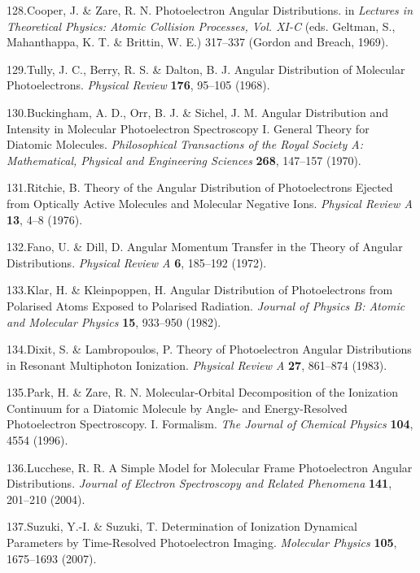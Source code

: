 \documentclass[10pt]{article}
\begin{document}
\label{csl:128}128.Cooper, J. \& Zare, R. N. {Photoelectron {{Angular Distributions}}}. in \textit{Lectures in {{Theoretical Physics}}: {{Atomic Collision Processes}}, {{Vol}}. {{XI}}-{{C}}} (eds. Geltman, S., Mahanthappa, K. T. \& Brittin, W. E.) 317–337 ({Gordon and Breach}, 1969).

\label{csl:129}129.Tully, J. C., Berry, R. S. \& Dalton, B. J. {Angular {{Distribution}} of {{Molecular Photoelectrons}}}. \textit{Physical Review} \textbf{176}, 95–105 (1968).

\label{csl:130}130.Buckingham, A. D., Orr, B. J. \& Sichel, J. M. {Angular {{Distribution}} and {{Intensity}} in {{Molecular Photoelectron Spectroscopy I}}. {{General Theory}} for {{Diatomic Molecules}}}. \textit{Philosophical Transactions of the Royal Society A: Mathematical, Physical and Engineering Sciences} \textbf{268}, 147–157 (1970).

\label{csl:131}131.Ritchie, B. {Theory of the Angular Distribution of Photoelectrons Ejected from Optically Active Molecules and Molecular Negative Ions}. \textit{Physical Review A} \textbf{13}, 4–8 (1976).

\label{csl:132}132.Fano, U. \& Dill, D. {Angular {{Momentum Transfer}} in the {{Theory}} of {{Angular Distributions}}}. \textit{Physical Review A} \textbf{6}, 185–192 (1972).

\label{csl:133}133.Klar, H. \& Kleinpoppen, H. {Angular Distribution of Photoelectrons from Polarised Atoms Exposed to Polarised Radiation}. \textit{Journal of Physics B: Atomic and Molecular Physics} \textbf{15}, 933–950 (1982).

\label{csl:134}134.Dixit, S. \& Lambropoulos, P. {Theory of Photoelectron Angular Distributions in Resonant Multiphoton Ionization}. \textit{Physical Review A} \textbf{27}, 861–874 (1983).

\label{csl:135}135.Park, H. \& Zare, R. N. {Molecular-Orbital Decomposition of the Ionization Continuum for a Diatomic Molecule by Angle- and Energy-Resolved Photoelectron Spectroscopy. {{I}}. {{Formalism}}}. \textit{The Journal of Chemical Physics} \textbf{104}, 4554 (1996).

\label{csl:136}136.Lucchese, R. R. {A Simple Model for Molecular Frame Photoelectron Angular Distributions}. \textit{Journal of Electron Spectroscopy and Related Phenomena} \textbf{141}, 201–210 (2004).

\label{csl:137}137.Suzuki, Y.-I. \& Suzuki, T. {Determination of Ionization Dynamical Parameters by Time-Resolved Photoelectron Imaging}. \textit{Molecular Physics} \textbf{105}, 1675–1693 (2007).
\end{document}

